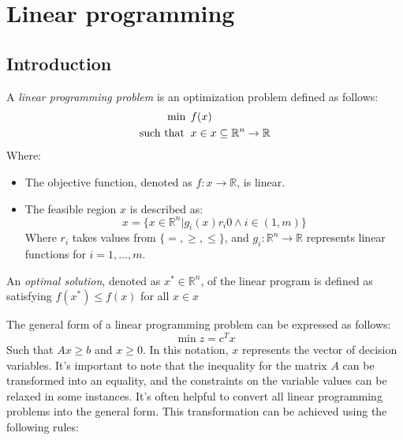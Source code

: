 \documentclass[12pt, a4paper]{report}
\begin{document}
\newpage 

\chapter{Linear programming}
    \section{Introduction}
    \begin{definition}
        A \emph{linear programming problem} is an optimization problem defined as follows:
        \begin{align*}
            \min                      \:&\:f(x)           \\
            \textnormal{such that }     &\: x \in x \subseteq \mathbb{R}^n \rightarrow \mathbb{R} 
        \end{align*}
        Where: 
        \begin{itemize}
            \item The objective function, denoted as $f:x \rightarrow \mathbb{R}$, is linear. 
            \item The feasible region $x$ is described as:
                \[x=\{x\in\mathbb{R}^n|g_i(x)r_i0\land i\in(1,m)\}\]
                Where $r_i$ takes values from $\{=,\geq,\leq\}$, and $g_i:\mathbb{R}^n\rightarrow\mathbb{R}$ represents linear functions for $i=1,\dots,m$.
        \end{itemize}
    
        An \emph{optimal solution}, denoted as $x^{*} \in \mathbb{R}^n$, of the linear program is defined as satisfying $f(x^{*}) \leq f(x)$ for all $x\in x$
    \end{definition}
    The general form of a linear programming problem can be expressed as follows:
    \[\min{z}=c^Tx\]
    Such that $Ax \geq b$ and $x \geq 0$. 
    In this notation, $x$ represents the vector of decision variables.
    It's important to note that the inequality for the matrix $A$ can be transformed into an equality, and the constraints on the variable values can be relaxed in some instances.
    It's often helpful to convert all linear programming problems into the general form.
    This transformation can be achieved using the following rules:
\end{document}
